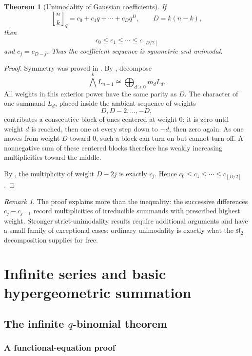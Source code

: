 \documentclass[11pt,oneside,openany]{book}
\newtheorem{theorem}{Theorem}[chapter]
\theoremstyle{definition}
\theoremstyle{remark}
\newtheorem{remark}[remark]{Remark}
\newcommand{\qbinom}[2]{\genfrac{[}{]}{0pt}{}{#1}{#2}_{q}}
\newcommand{\floor}[1]{\left\lfloor #1\right\rfloor}
\begin{document}
\begin{theorem}[Unimodality of Gaussian coefficients]\label{thm:qbinom-unimodal}
If
\[
 \qbinom nk=c_0+c_1q+\cdots+c_Dq^D,
 \qquad D=k(n-k),
\]
then
\[
 c_0\le c_1\le\cdots\le c_{\floor{D/2}}
\]
and $c_j=c_{D-j}$.  Thus the coefficient sequence is symmetric and unimodal.
\end{theorem}

\begin{proof}
Symmetry was proved in .  By , decompose
\[
 \bigwedge^kL_{n-1}\cong\bigoplus_{d\ge0}m_dL_d.
\]
All weights in this exterior power have the same parity as $D$.  The character of one summand $L_d$, placed inside the ambient sequence of weights
\[
 D,D-2,\dots,-D,
\]
contributes a consecutive block of ones centered at weight $0$: it is zero until weight $d$ is reached, then one at every step down to $-d$, then zero again.  As one moves from weight $D$ toward $0$, such a block can turn on but cannot turn off.  A nonnegative sum of these centered blocks therefore has weakly increasing multiplicities toward the middle.

By , the multiplicity of weight $D-2j$ is exactly $c_j$.  Hence $c_0\le c_1\le\cdots\le c_{\floor{D/2}}$.
\end{proof}

\begin{remark}
The proof explains more than the inequality: the successive differences $c_j-c_{j-1}$ record multiplicities of irreducible summands with prescribed highest weight.  Stronger strict-unimodality results require additional arguments and have a small family of exceptional cases; ordinary unimodality is exactly what the $\mathfrak{sl}_2$ decomposition supplies for free.
\end{remark}


\part{Infinite series and basic hypergeometric summation}

\chapter{The infinite \texorpdfstring{$q$}{q}-binomial theorem}\label{chap:infinite-qbinomial}

\section{A functional-equation proof}
\end{document}
